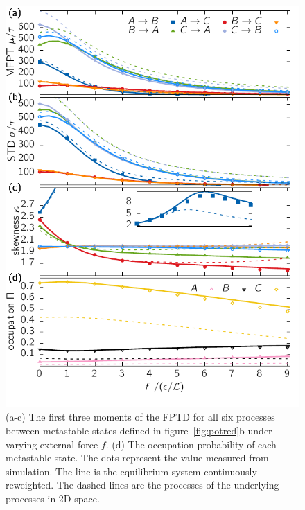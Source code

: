\begin{figure}
\centering
 \includegraphics{../plots/Frew/mom_1030.pdf}
 \caption[The first three moments and the population of metastable states for the reduced 1D system for varying driving forces.]{(a-c) The first three moments of the FPTD for all six processes between metastable states defined in figure~\ref{fig:potred}b under varying external force $f$. (d) The occupation probability of each metastable state. The dots represent the value measured from simulation. The line is the equilibrium system continuously reweighted. The dashed lines are the processes of the underlying processes in 2D space.  }
 \label{fig:momred}
\end{figure}

